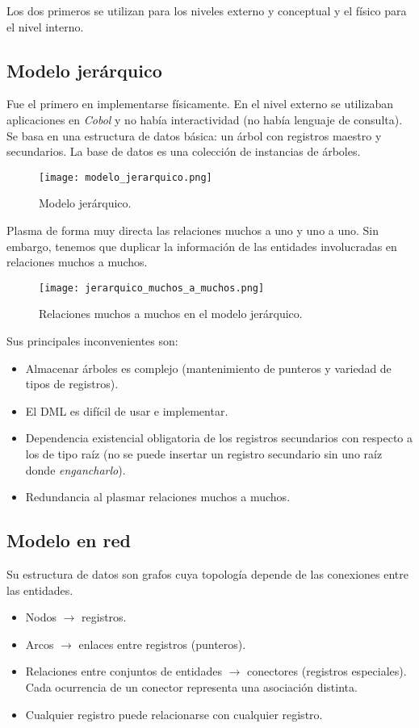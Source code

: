 \documentclass[12pt,spanish]{article}
\numberwithin{definition}{subsection}
\begin{document}
Los dos primeros se utilizan para los niveles externo y conceptual y el físico para el nivel interno.


\subsection{Modelo jerárquico}

Fue el primero en implementarse físicamente. En el nivel externo se utilizaban aplicaciones en \textit{Cobol} y no había interactividad (no había lenguaje de consulta).\\

Se basa en una estructura de datos básica: un árbol con registros maestro y secundarios. La base de datos es una colección de instancias de árboles.


\begin{figure}[H]
\centering
\texttt{[image: modelo\_jerarquico.png]}
\caption{Modelo jerárquico.}
\end{figure}

Plasma de forma muy directa las relaciones muchos a uno y uno a uno. Sin embargo, tenemos que duplicar la información de las entidades involucradas en relaciones muchos a muchos.

\begin{figure}[H]
\centering
\texttt{[image: jerarquico\_muchos\_a\_muchos.png]}
\caption{Relaciones muchos a muchos en el modelo jerárquico.}
\end{figure}

Sus principales inconvenientes son:

\begin{itemize}
	\item Almacenar árboles es complejo (mantenimiento de punteros y variedad de tipos de registros).
	\item El DML es difícil de usar e implementar.
	\item Dependencia existencial obligatoria de los registros secundarios con respecto a los de tipo raíz (no se puede insertar un registro secundario sin uno raíz donde \emph{engancharlo}).
	\item Redundancia al plasmar relaciones muchos a muchos.
\end{itemize}

\subsection{Modelo en red}

Su estructura de datos son grafos cuya topología depende de las conexiones entre las entidades.
\begin{itemize}
	\item Nodos $\rightarrow$ registros.
	\item Arcos $\rightarrow$ enlaces entre registros (punteros).
	\item Relaciones entre conjuntos de entidades $\rightarrow$ conectores (registros especiales). Cada ocurrencia de un conector representa una asociación distinta.
	\item Cualquier registro puede relacionarse con cualquier registro.
\end{itemize}
\end{document}
